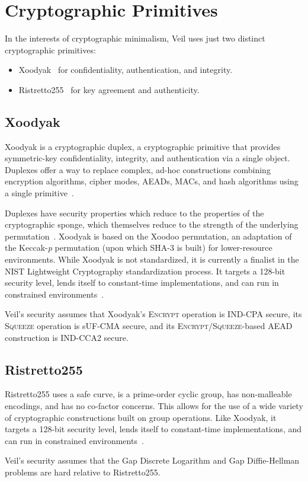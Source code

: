 \section{Cryptographic Primitives}\label{sec:cryptographic-primitives}

In the interests of cryptographic minimalism, Veil uses just two distinct cryptographic primitives:

\begin{itemize}
    \item Xoodyak~\cite{daemen2020} for confidentiality, authentication, and integrity.
    \item Ristretto255~\cite{deValence2020} for key agreement and authenticity.
\end{itemize}

\subsection{Xoodyak}\label{subsec:xoodyak}

Xoodyak is a cryptographic duplex, a cryptographic primitive that provides symmetric-key confidentiality,
integrity, and authentication via a single object.
Duplexes offer a way to replace complex, ad-hoc constructions combining encryption algorithms, cipher modes,
AEADs, MACs, and hash algorithms using a single primitive~\cite{daemen2020, bertoni2011duplex}.

Duplexes have security properties which reduce to the properties of the cryptographic sponge, which themselves reduce to
the strength of the underlying permutation~\cite{bertoni2008}.
Xoodyak is based on the Xoodoo permutation, an adaptation of the
Keccak-\emph{p} permutation (upon which SHA-3 is built) for lower-resource environments.
While Xoodyak is not standardized, it is currently a finalist in the NIST Lightweight Cryptography
standardization process.
It targets a 128-bit security level, lends itself to constant-time implementations, and can run in constrained
environments~\cite{daemen2020}.

Veil's security assumes that Xoodyak's \textsc{Encrypt} operation is IND-CPA secure, its
\textsc{Squeeze} operation is sUF-CMA secure, and its
\textsc{Encrypt}/\textsc{Squeeze}-based AEAD construction is IND-CCA2 secure.

\subsection{Ristretto255}\label{subsec:ristretto255}

Ristretto255 uses a safe curve, is a prime-order cyclic group, has non-malleable encodings, and has no
co-factor concerns.
This allows for the use of a wide variety of cryptographic constructions built on group operations.
Like Xoodyak, it targets a 128-bit security level, lends itself to constant-time implementations, and can
run in constrained environments~\cite{deValence2018}.

Veil's security assumes that the Gap Discrete Logarithm and Gap Diffie-Hellman problems are hard relative to
Ristretto255.
